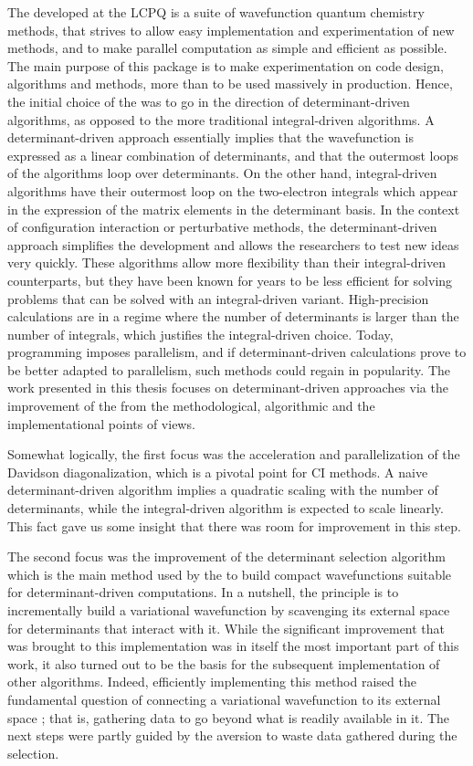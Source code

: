 \documentclass[12pt,a4paper]{report}
\begin{document}
The \QP developed at the LCPQ is a suite of wavefunction quantum
chemistry methods, that strives to allow easy implementation and
experimentation of new methods, and to make parallel computation
as simple and efficient as possible. The main purpose of this package
is to make experimentation on code design, algorithms and methods,
more than to be used massively in production.
Hence, the initial choice of the \QP was to go in the direction of
determinant-driven algorithms, as opposed to the more traditional
integral-driven algorithms.
A determinant-driven approach essentially implies that the wavefunction
is expressed as a linear combination of determinants, and that the 
outermost loops of the algorithms loop over determinants.
On the other hand, integral-driven algorithms have their outermost loop
on the two-electron integrals which appear in the expression of the matrix
elements in the determinant basis.
In the context of configuration interaction or perturbative
methods, the determinant-driven approach simplifies the development and allows
the researchers to test new ideas very quickly. These algorithms allow more
flexibility than their integral-driven
counterparts,\cite{Povill_1995} but they have been known for years to
be less efficient for solving problems that can be solved with an
integral-driven variant. High-precision calculations are in a regime
where the number of determinants is larger than the number of integrals,
which justifies the integral-driven choice.  Today, programming imposes
parallelism, and if
determinant-driven calculations prove to be better adapted to parallelism, such
methods could regain in popularity. The work presented in this thesis focuses
on determinant-driven approaches via the improvement of the \QP from
the methodological, algorithmic and the implementational points of views.


Somewhat logically, the first focus was the acceleration and parallelization of the
Davidson diagonalization, which is a pivotal point for CI methods.
A naive determinant-driven algorithm implies a quadratic scaling with the
number of determinants, while the integral-driven algorithm is expected to
scale linearly. This fact gave us some insight that there was room for
improvement in this step. 

The second focus was the improvement of the determinant selection algorithm
which is the main method used by the \QP to build compact wavefunctions
suitable for determinant-driven computations. In a nutshell, the principle is
to incrementally build a variational wavefunction by scavenging its external
space for determinants that interact with it. While the significant
improvement that was brought to this implementation was in itself the most
important part of this work, it also turned out to be the basis for the subsequent
implementation of other algorithms. Indeed, efficiently implementing this
method raised the fundamental question of connecting a variational wavefunction
to its external space ; that is, gathering data to go beyond what is readily
available in it. The next steps were partly guided by the aversion to waste
data gathered during the selection.
\end{document}
